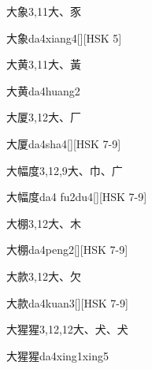 \begin{Entry}{大象}{3,11}{⼤、⾗}
  \begin{Phonetics}{大象}{da4xiang4}[][HSK 5]
  \end{Phonetics}
\end{Entry}

\begin{Entry}{大黄}{3,11}{⼤、⿈}
  \begin{Phonetics}{大黄}{da4huang2}
  \end{Phonetics}
\end{Entry}

\begin{Entry}{大厦}{3,12}{⼤、⼚}
  \begin{Phonetics}{大厦}{da4sha4}[][HSK 7-9]
  \end{Phonetics}
\end{Entry}

\begin{Entry}{大幅度}{3,12,9}{⼤、⼱、⼴}
  \begin{Phonetics}{大幅度}{da4 fu2du4}[][HSK 7-9]
  \end{Phonetics}
\end{Entry}

\begin{Entry}{大棚}{3,12}{⼤、⽊}
  \begin{Phonetics}{大棚}{da4peng2}[][HSK 7-9]
  \end{Phonetics}
\end{Entry}

\begin{Entry}{大款}{3,12}{⼤、⽋}
  \begin{Phonetics}{大款}{da4kuan3}[][HSK 7-9]
  \end{Phonetics}
\end{Entry}

\begin{Entry}{大猩猩}{3,12,12}{⼤、⽝、⽝}
  \begin{Phonetics}{大猩猩}{da4xing1xing5}
  \end{Phonetics}
\end{Entry}

